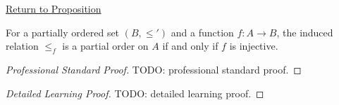 \newpage
{}
\label{prf:induced-poset}

\begin{remark*}[Return]
\hyperref[prop:induced-poset]{Return to Proposition}
\end{remark*}

\begin{proposition*}
For a partially ordered set $(B,\leq')$ and a function $f:A\to B$, the induced
relation $\leq_f$ is a partial order on $A$ if and only if $f$ is injective.
\end{proposition*}

\begin{proof}[Professional Standard Proof]
\LRAProofBodyStart
TODO: professional standard proof.
\end{proof}

\begin{proof}[Detailed Learning Proof]
\LRAProofBodyStart
TODO: detailed learning proof.
\end{proof}

\begin{remark*}
\end{remark*}

\begin{dependencies}
\NoLocalDependencies
\end{dependencies}

\clearpage
